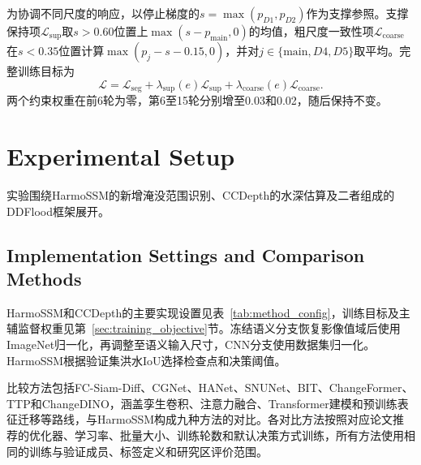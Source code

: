 \documentclass[authoryear,preprint,12pt]{elsarticle}
\begin{document}
为协调不同尺度的响应，以停止梯度的\(s=\max(p_{D1},p_{D2})\)作为支撑参照。支撑保持项\(\mathcal L_{\mathrm{sup}}\)取\(s>0.60\)位置上\(\max(s-p_{\mathrm{main}},0)\)的均值，粗尺度一致性项\(\mathcal L_{\mathrm{coarse}}\)在\(s<0.35\)位置计算\(\max(p_j-s-0.15,0)\)，并对\(j\in\{\mathrm{main},D4,D5\}\)取平均。完整训练目标为
\begin{equation}\label{eq:total_loss}
  \mathcal{L}
  =
  \mathcal{L}_{\mathrm{seg}}
  +
  \lambda_{\mathrm{sup}}(e)\mathcal{L}_{\mathrm{sup}}
  +
  \lambda_{\mathrm{coarse}}(e)\mathcal{L}_{\mathrm{coarse}}.
\end{equation}
两个约束权重在前6轮为零，第6至15轮分别增至0.03和0.02，随后保持不变。

\endgroup

\section{Experimental Setup}\label{sec:eval_protocol}

实验围绕HarmoSSM的新增淹没范围识别、CCDepth的水深估算及二者组成的DDFlood框架展开。

\begingroup
\color{black}
\def\cnexperimenttableformat{\color{black}\arrayrulecolor{black}\captionsetup{font+={color=black},labelfont+={color=black}}}
\subsection{Implementation Settings and Comparison Methods}\label{sec:experiment_implementation}

HarmoSSM和CCDepth的主要实现设置见表~\ref{tab:method_config}，训练目标及主辅监督权重见第~\ref{sec:training_objective}节。冻结语义分支恢复影像值域后使用ImageNet归一化，再调整至语义输入尺寸，CNN分支使用数据集归一化。HarmoSSM根据验证集洪水IoU选择检查点和决策阈值。



比较方法包括FC-Siam-Diff\citep{daudt2018fully}、CGNet\citep{han2023change}、HANet\citep{han2023hanet}、SNUNet\citep{fang2022snunet}、BIT\citep{chen2021remote}、ChangeFormer\citep{bandara2022changeformer}、TTP\citep{chen2023ttp}和ChangeDINO\citep{cheng2025changedino}，涵盖孪生卷积、注意力融合、Transformer建模和预训练表征迁移等路线，与HarmoSSM构成九种方法的对比。各对比方法按照对应论文推荐的优化器、学习率、批量大小、训练轮数和默认决策方式训练，所有方法使用相同的训练与验证成员、标签定义和研究区评价范围。
\end{document}
